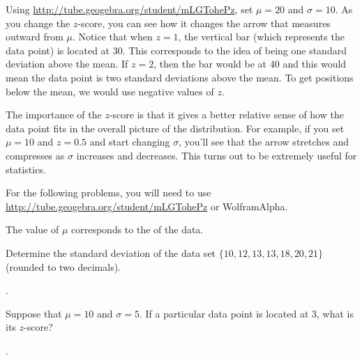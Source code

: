 \documentclass{ximera}
\begin{document}
Using \href{http://tube.geogebra.org/student/mLGTohePz}{http://tube.geogebra.org/student/mLGTohePz}, set $\mu = 20$ and $\sigma = 10$. As you change the $z$-score, you can see how it changes the arrow that measures outward from $\mu$. Notice that when $z = 1$, the vertical bar (which represents the data point) is located at 30. This corresponds to the idea of being one standard deviation above the mean. If $z = 2$, then the bar would be at 40 and this would mean the data point is two standard deviations above the mean. To get positions below the mean, we would use negative values of $z$.

The importance of the $z$-score is that it gives a better relative sense of how the data point fits in the overall picture of the distribution. For example, if you set $\mu = 10$ and $z = 0.5$ and start changing $\sigma$, you'll see that the arrow stretches and compresses as $\sigma$ increases and decreases. This turns out to be extremely useful for statistics.

For the following problems, you will need to use \href{http://tube.geogebra.org/student/mLGTohePz}{http://tube.geogebra.org/student/mLGTohePz} or WolframAlpha.

\begin{question}
The value of $\mu$ corresponds to the \underline{\hspace{30pt}} of the data.

    \begin{multipleChoice}
    \end{multipleChoice}

\end{question}

\begin{question}
Determine the standard deviation of the data set $\{ 10, 12, 13, 13, 18, 20, 21\}$ (rounded to two decimals).

    .

\end{question}

\begin{question}
Suppose that $\mu = 10$ and $\sigma = 5$. If a particular data point is located at 3, what is its $z$-score?

    .

\end{question}
\end{document}
